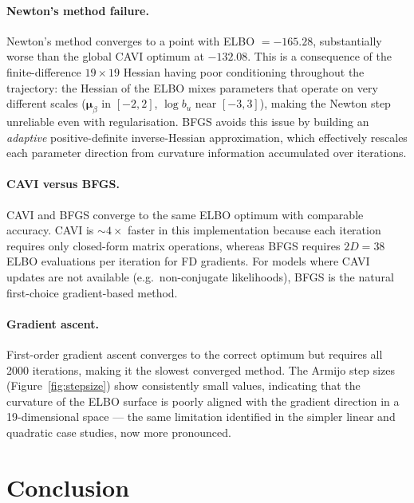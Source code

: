 \documentclass[11pt,a4paper]{article}
\begin{document}
\paragraph{Newton's method failure.}
Newton's method converges to a point with ELBO $= -165.28$, substantially worse than
the global CAVI optimum at $-132.08$.
This is a consequence of the finite-difference $19\times19$ Hessian having poor
conditioning throughout the trajectory: the Hessian of the ELBO mixes parameters
that operate on very different scales ($\bm{\mu}_\beta$ in $[-2,2]$, $\log b_u$ near
$[-3, 3]$), making the Newton step unreliable even with regularisation.
BFGS avoids this issue by building an \emph{adaptive} positive-definite inverse-Hessian
approximation, which effectively rescales each parameter direction from curvature
information accumulated over iterations.

\paragraph{CAVI versus BFGS.}
CAVI and BFGS converge to the same ELBO optimum with comparable accuracy.
CAVI is $\sim 4\times$ faster in this implementation because each iteration requires
only closed-form matrix operations, whereas BFGS requires $2D = 38$ ELBO evaluations
per iteration for FD gradients.
For models where CAVI updates are not available (e.g.\ non-conjugate likelihoods),
BFGS is the natural first-choice gradient-based method.

\paragraph{Gradient ascent.}
First-order gradient ascent converges to the correct optimum but requires all 2000
iterations, making it the slowest converged method.
The Armijo step sizes (Figure~\ref{fig:stepsize}) show consistently small values,
indicating that the curvature of the ELBO surface is poorly aligned with the gradient
direction in a 19-dimensional space --- the same limitation identified in the simpler
linear and quadratic case studies, now more pronounced.

\section{Conclusion}
\end{document}
